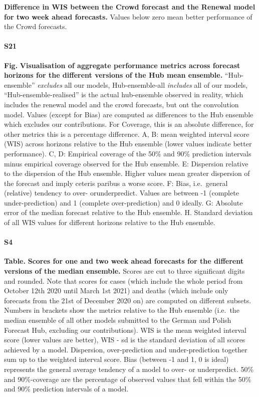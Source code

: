 \documentclass[10pt,letterpaper]{article}
\begin{document}
\textbf{Difference in WIS between the Crowd forecast and the Renewal model for two week ahead forecasts.}
Values below zero mean better performance of the Crowd forecasts.

\paragraph{S21}

\textbf{Fig.} \label{fig:agg-performance-ensemble-mean}
\textbf{Visualisation of aggregate performance metrics across forecast horizons for the different versions of the Hub mean ensemble.}
``Hub-ensemble'' \textit{excludes} all our models, Hub-ensemble-all
\textit{includes} all of our models, ``Hub-ensemble-realised'' is the
actual hub-ensemble observed in reality, which includes the renewal
model and the crowd forecasts, but ont the convolution model. Values
(except for Bias) are computed as differences to the Hub ensemble which
excludes our contributions. For Coverage, this is an absolute
difference, for other metrics this is a percentage difference. A, B:
mean weighted interval score (WIS) across horizons relative to the Hub
ensemble (lower values indicate better performance). C, D: Empirical
coverage of the 50\% and 90\% prediction intervals minus empirical
coverage observed for the Hub ensemble. E: Dispersion relative to the
dispersion of the Hub ensemble. Higher values mean greater dispersion of
the forecast and imply ceteris paribus a worse score. F: Bias,
i.e.~general (relative) tendency to over- orunderpredict. Values are
between -1 (complete under-prediction) and 1 (complete over-prediction)
and 0 ideally. G: Absolute error of the median forecast relative to the
Hub ensemble. H. Standard deviation of all WIS values for different
horizons relative to the Hub ensemble.

\paragraph{S4}

\textbf{Table.} \label{tab:score-table-ensemble-2}
\textbf{Scores for one and two week ahead forecasts for the different versions of the median ensemble.}
Scores are cut to three significant digits and rounded. Note that scores
for cases (which include the whole period from October 12th 2020 until
March 1st 2021) and deaths (which include only forecasts from the 21st
of December 2020 on) are computed on different subsets. Numbers in
brackets show the metrics relative to the Hub ensemble (i.e.~the median
ensemble of all other models submitted to the German and Polish Forecast
Hub, excluding our contributions). WIS is the mean weighted interval
score (lower values are better), WIS - sd is the standard deviation of
all scores achieved by a model. Dispersion, over-prediction and
under-prediction together sum up to the weighted interval score. Bias
(between -1 and 1, 0 is ideal) represents the general average tendency
of a model to over- or underpredict. 50\% and 90\%-coverage are the
percentage of observed values that fell within the 50\% and 90\%
prediction intervals of a model.
\end{document}
